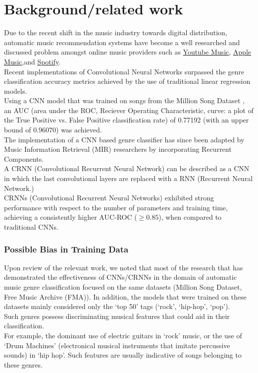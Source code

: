 \documentclass[12pt]{article}
\newcounter{ct}
\begin{document}
\section*{Background/related work}
Due to the recent shift in the music industry towards digital distribution,
automatic music recommendation systems have become a well 
researched and discussed
problem amongst online music providers such as 
\href{https://www.youtube.com/musicpremium}
{Youtube Music}, 
\href{https://www.apple.com/music/}
{Apple Music},and 
\href{https://www.spotify.com/}{Spotify}.\\
Recent implementations of Convolutional Neural Networks 
surpassed the genre classification accuracy metrics achieved  
by the use of traditional linear regression models.\cite{c4} \\ Using a CNN 
model that was trained on songs from the 
Million Song Dataset \cite{c5}, an AUC (area under the ROC, 
Reciever Operating Characteristic, curve: a plot of the True Positive
vs.
False Positive classification rate) of 0.77192 (with an upper bound of
0.96070) was achieved. \cite{c4}\\
The implementation of a CNN based genre classifier 
has since been adapted by 
Music Information Retrieval (MIR) 
researchers by incorporating Recurrent Components.\\
A CRNN (Convolutional Recurrent Neural Network) can be described
as a CNN in which the last convolutional layers are replaced
with a RNN (Recurrent Neural Network.)\\
CRNNs (Convolutional Recurrent Neural Networks) exhibited
strong performance with respect to the number of parameters 
and training time, achieving a consistently higher
AUC-ROC ($\ge 0.85$), when compared to traditional CNNs.\cite{c6}

\subsubsection*{Possible Bias in Training Data}
Upon review of the relevant work, we noted that most of the 
research that has demonstrated the effectiveness of CNNs/CRNNs 
in the domain of automatic music genre
classification focused on the same datasets (Million Song Dataset, 
Free Music Archive (FMA))\cite{c7}. 
In addition, the models that were trained
on these datasets mainly considered only the `top 50' tags (`rock',
`hip-hop', `pop').\\
Such genres possess
discriminating musical features that could aid in their classification.\\
For example, the dominant use of electric guitars in `rock' music, 
or the use of `Drum Machines' (electronical musical instruments
that imitate percussive sounds) in `hip hop'. Such features are 
usually indicative 
of songs belonging to these genres.
\end{document}
